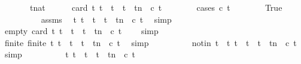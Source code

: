 \begin{isabellebody}
%
\isadelimproof
%
\endisadelimproof
%
\isatagproof
{}\isamarkupfalse%
\ {\isacharminus}\isanewline
\ \ \isacommand{{\isacharbraceleft}}\isamarkupfalse%
\ \isamarkupfalse%
\ t{\isacharcolon}{\isacharcolon}nat\isanewline
\ \ \ \ \isamarkupfalse%
\ {\isacartoucheopen}card\ {\isacharbraceleft}t{\isacharprime}{\isachardot}\ t\ {\isasymle}\ t{\isacharprime}\ {\isasymand}\ t{\isacharprime}\ {\isasymle}\ t{\isacharplus}n\ {\isasymand}\ c\ t{\isacharprime}{\isacharbraceright}\ {\isasymle}\ {}{\isacartoucheclose}\isanewline
\ \ \ \ \isamarkupfalse%
\ {\isacharparenleft}cases\ {\isacartoucheopen}c\ t{\isacartoucheclose}{\isacharparenright}\isanewline
\ \ \ \ \ \ \isamarkupfalse%
\ True\isanewline
\ \ \ \ \ \ \ \ \isamarkupfalse%
\ assms\ \isamarkupfalse%
\ {\isacartoucheopen}{\isasymforall}t{\isacharprime}{\isachardot}\ {\isacharparenleft}t\ {\isacharless}\ t{\isacharprime}\ {\isasymand}\ t{\isacharprime}\ {\isasymle}\ t{\isacharplus}n{\isacharparenright}\ {\isasymlongrightarrow}\ {\isasymnot}{\isacharparenleft}c\ t{\isacharprime}{\isacharparenright}{\isacartoucheclose}\ \isamarkupfalse%
\ simp\isanewline
\ \ \ \ \ \ \ \ \isamarkupfalse%
\ empty{\isacharcolon}\ {\isacartoucheopen}card\ {\isacharbraceleft}t{\isacharprime}{\isachardot}\ t\ {\isacharless}\ t{\isacharprime}\ {\isasymand}\ t{\isacharprime}\ {\isasymle}\ t{\isacharplus}n\ {\isasymand}\ c\ t{\isacharprime}{\isacharbraceright}\ {\isacharequal}\ {}{\isacartoucheclose}\ \isamarkupfalse%
\ simp\isanewline
\ \ \ \ \ \ \ \ \isamarkupfalse%
\ finite{\isacharcolon}\ {\isacartoucheopen}finite\ {\isacharbraceleft}t{\isacharprime}{\isachardot}\ t\ {\isacharless}\ t{\isacharprime}\ {\isasymand}\ t{\isacharprime}\ {\isasymle}\ t{\isacharplus}n\ {\isasymand}\ c\ t{\isacharprime}{\isacharbraceright}{\isacartoucheclose}\ \isamarkupfalse%
\ simp\isanewline
\ \ \ \ \ \ \ \ \isamarkupfalse%
\ notin{\isacharcolon}\ {\isacartoucheopen}t\ {\isasymnotin}\ {\isacharbraceleft}t{\isacharprime}{\isachardot}\ t\ {\isacharless}\ t{\isacharprime}\ {\isasymand}\ t{\isacharprime}\ {\isasymle}\ t{\isacharplus}n\ {\isasymand}\ c\ t{\isacharprime}{\isacharbraceright}{\isacartoucheclose}\ \isamarkupfalse%
\ simp\isanewline
\ \ \ \ \ \ \ \ \isamarkupfalse%
\ {\isacartoucheopen}{\isacharbraceleft}t{\isacharprime}{\isachardot}\ t\ {\isasymle}\ t{\isacharprime}\ {\isasymand}\ t{\isacharprime}\ {\isasymle}\ t{\isacharplus}n\ {\isasymand}\ c\ t{\isacharprime}{\isacharbraceright}\isanewline

\end{isabellebody}

